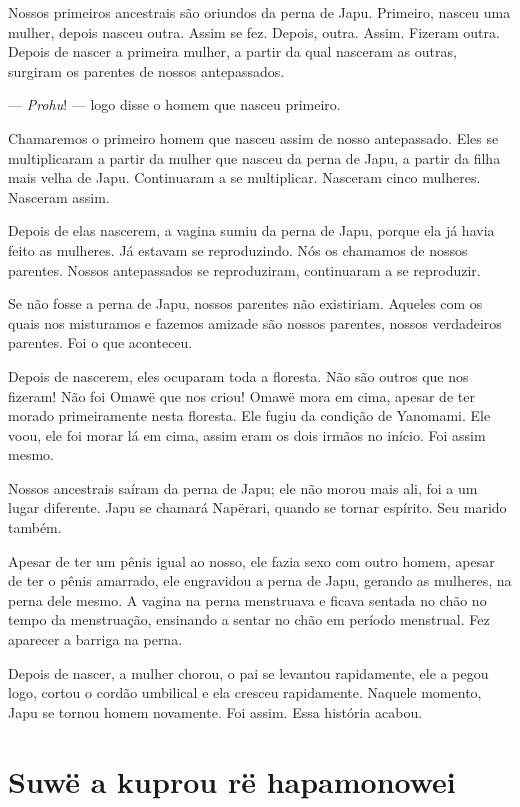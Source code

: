 Nossos primeiros ancestrais são oriundos da perna de Japu. Primeiro,
 nasceu uma mulher, depois nasceu outra. Assim se fez. Depois, outra.
 Assim. Fizeram outra. Depois de nascer a primeira mulher, a partir da
 qual nasceram as outras, surgiram os parentes de nossos antepassados. 

--- \textit{Prohu}! --- logo disse o homem que nasceu primeiro. 

Chamaremos o primeiro homem que nasceu assim de nosso antepassado.
 Eles se multiplicaram a partir da mulher que nasceu da perna de Japu, a
 partir da filha mais velha de Japu. Continuaram a se multiplicar.
 Nasceram cinco mulheres. Nasceram assim. 

Depois de elas nascerem, a vagina sumiu da perna de Japu, porque ela já
havia feito as mulheres. Já estavam se reproduzindo. Nós os chamamos de
nossos parentes. Nossos antepassados se reproduziram, continuaram a se
reproduzir. 

Se não fosse a perna de Japu, nossos parentes não existiriam. Aqueles
com os quais nos misturamos e fazemos amizade são nossos parentes,
nossos verdadeiros parentes. Foi o que aconteceu.

Depois de nascerem, eles ocuparam toda a floresta. Não são outros que
nos fizeram! Não foi Omawë que nos criou! Omawë mora em cima, apesar de
ter morado primeiramente nesta floresta. Ele fugiu da condição de
Yanomami. Ele voou, ele foi morar lá em cima, assim eram os dois irmãos
no início. Foi assim mesmo. 

Nossos ancestrais saíram da perna de Japu; ele não morou mais ali, foi a
um lugar diferente. Japu se chamará Napërari, quando se tornar
espírito. Seu marido também.

Apesar de ter um pênis igual ao nosso, ele fazia sexo com outro homem,
apesar de ter o pênis amarrado, ele engravidou a perna de Japu, gerando
as mulheres, na perna dele mesmo. A vagina na perna menstruava e ficava
sentada no chão no tempo da menstruação, ensinando a sentar no chão em
período menstrual. Fez aparecer a barriga na perna. 

Depois de nascer, a mulher chorou, o pai se levantou rapidamente, ele a
pegou logo, cortou o cordão umbilical e ela cresceu rapidamente. Naquele
momento, Japu se tornou homem novamente. Foi assim. Essa história
acabou.

\chapter{Suwë a kuprou rë hapamonowei}
\vspace*{3\baselineskip}

